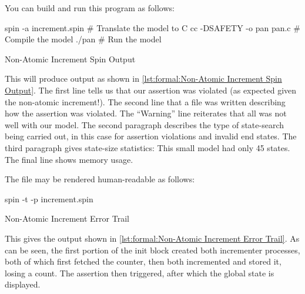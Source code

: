 You can build and run this program as follows:

\begin{VerbatimU}
spin -a increment.spin      # Translate the model to C
cc -DSAFETY -o pan pan.c    # Compile the model
./pan                       # Run the model
\end{VerbatimU}

\begin{listing}
\vspace*{-9pt}
\caption{Non-Atomic Increment Spin Output}
\label{lst:formal:Non-Atomic Increment Spin Output}
\end{listing}

This will produce output as shown in
\cref{lst:formal:Non-Atomic Increment Spin Output}.
The first line tells us that our assertion was violated (as expected
given the non-atomic increment!).
The second line that a  file was written describing how the
assertion was violated.
The ``Warning'' line reiterates that all was not well with our model.
The second paragraph describes the type of state-search being carried out,
in this case for assertion violations and invalid end states.
The third paragraph gives state-size statistics:
This small model had only 45 states.
The final line shows memory usage.

The  file may be rendered human-readable as follows:

\begin{VerbatimU}
spin -t -p increment.spin
\end{VerbatimU}

\begin{listing*}
\IfEbookSize{\vspace*{7pt}}{\vspace*{-9pt}}
\caption{Non-Atomic Increment Error Trail}
\label{lst:formal:Non-Atomic Increment Error Trail}
\end{listing*}

This gives the output shown in
\cref{lst:formal:Non-Atomic Increment Error Trail}.
As can be seen, the first portion of the init block created both
incrementer processes, both of which first fetched the counter,
then both incremented and stored it, losing a count.
The assertion then triggered, after which the global state is displayed.

